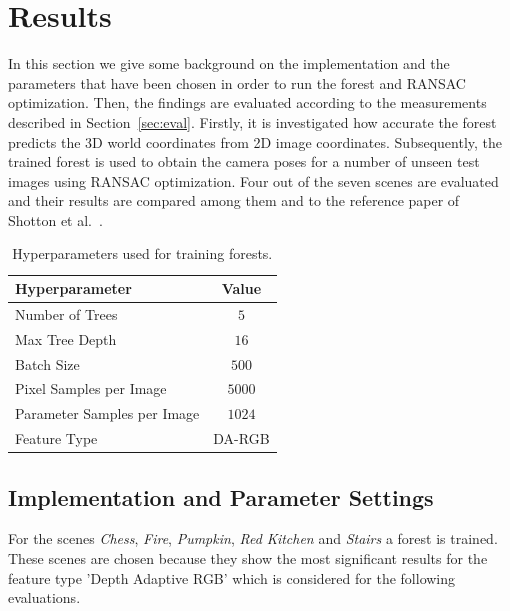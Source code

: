 \documentclass[final]{cvpr}
\begin{document}

\section{Results}
In this section we give some background on the implementation and the parameters that have been chosen in order to 
run the forest and RANSAC optimization. Then, the findings are evaluated according to the measurements described
in Section~\ref{sec:eval}. Firstly, it is investigated how accurate the 
forest predicts the 3D world coordinates from 2D image coordinates. Subsequently, the trained forest is used to obtain 
the camera poses for a number of unseen test images using RANSAC optimization. Four out of the seven scenes 
are evaluated and their results are compared among them and to the reference paper of Shotton et al.~\cite{shotton2013}. 

\begin{table}[h!]
	\begin{center}
	\begin{tabular}{|l|c|}
	\hline
	Hyperparameter & Value \\
	\hline\hline
	Number of Trees & $5$ \\
	Max Tree Depth & $16$ \\
	Batch Size & $500$ \\
	Pixel Samples per Image & $5000$ \\
	Parameter Samples per Image  & $1024$ \\
	Feature Type & DA-RGB \\
	\hline
	\end{tabular}
	\end{center}
	\caption{Hyperparameters used for training forests.}
	\label{tab:params-forest}
\end{table}

\subsection{Implementation and Parameter Settings}
For the scenes \textit{Chess}, \textit{Fire},  \textit{Pumpkin},  \textit{Red Kitchen} and  \textit{Stairs} a forest is
trained. These scenes are chosen because they show the most significant results for the feature type 'Depth Adaptive RGB' 
which is considered for the following evaluations.
\end{document}
